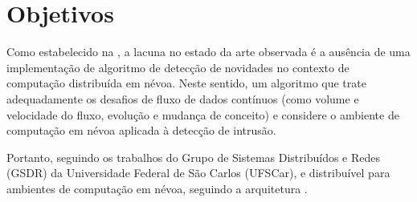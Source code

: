 
\section{Objetivos}\label{sec:objetivos}

Como estabelecido na , a lacuna no estado da arte observada é a
ausência de uma implementação de algoritmo de detecção de novidades no contexto
de computação distribuída em névoa.
Neste sentido, um algoritmo que trate adequadamente os desafios de fluxo de
dados contínuos (como volume e velocidade do fluxo, evolução e mudança de
conceito) e considere o ambiente de computação em névoa aplicada à detecção de
intrusão.

Portanto, seguindo os trabalhos do Grupo de Sistemas Distribuídos e Redes (GSDR)
da Universidade Federal de São Carlos (UFSCar), 
e distribuível para ambientes de computação em névoa, seguindo a
arquitetura \arch \cite{Cassales2019}.

